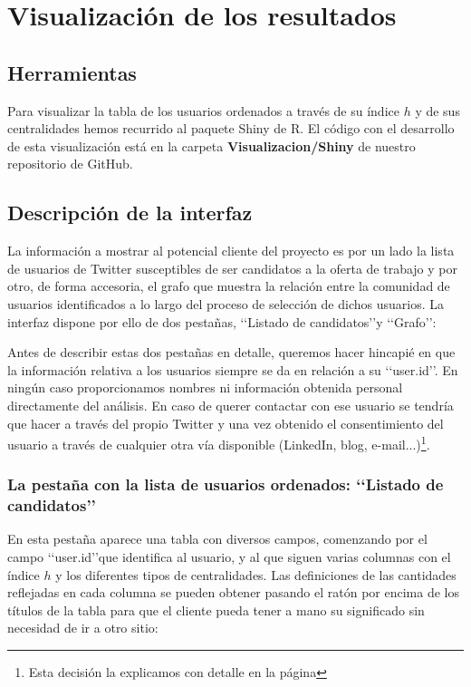 \chapter{Visualizaci\'on de los resultados}
\label{chap:visualizacion}
\section{Herramientas}
Para visualizar la tabla de los usuarios ordenados a través de su índice $h$ y de sus centralidades
hemos recurrido al paquete Shiny de R. El código con el desarrollo de esta visualización
está en la carpeta {\bf Visualizacion/Shiny} de nuestro repositorio de GitHub.

\section{Descripción de la interfaz}
La información a mostrar al potencial cliente del proyecto es por un lado 
la lista de usuarios de Twitter susceptibles de ser candidatos a la oferta
de trabajo y por otro, de forma accesoria, el grafo que muestra la relación
entre la comunidad de usuarios identificados a lo largo del proceso de 
selección de dichos usuarios. La interfaz dispone por ello de dos pestañas, \lq\lq Listado 
de candidatos\rq\rq y \lq\lq Grafo\rq\rq:


Antes de describir estas dos pestañas en detalle,
queremos hacer hincapié en que la información relativa a los usuarios siempre 
se da en relación a su \lq\lq user.id\rq\rq. 
En ningún caso proporcionamos nombres ni información obtenida personal directamente del análisis. 
En caso de querer contactar con ese usuario se tendría que hacer a través del propio Twitter y 
una vez obtenido el consentimiento del usuario a través de cualquier otra vía disponible 
(LinkedIn, blog, e-mail...)\footnote{Esta decisión la explicamos con detalle en la página 
\pageref{note:why_only_user_id}}. 



\subsection{La pestaña con la lista de usuarios ordenados: \lq\lq Listado de candidatos\rq\rq}
En esta pestaña aparece una tabla con diversos campos, comenzando
por el campo \lq\lq user.id\rq\rq que identifica al usuario, y al que siguen varias columnas 
con el índice $h$ y los diferentes tipos de centralidades. 
Las definiciones de las cantidades reflejadas en cada columna
se pueden obtener pasando el ratón por encima 
de los títulos de la tabla para que el cliente pueda tener a mano su significado sin necesidad 
de ir a otro sitio:

